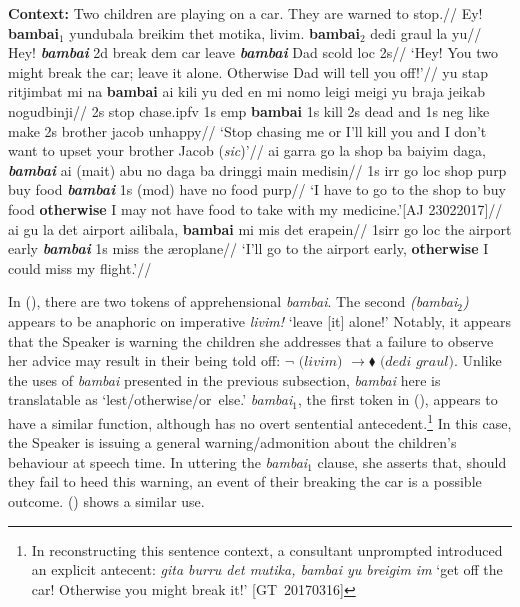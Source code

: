 \pex[interpartskip=1ex]
\a{}\begingl
\glpreamble \textbf{Context:} Two children are playing on a car. They are warned to stop.//
\gla Ey! \textbf{bambai$_1$} yundubala breikim thet motika, livim. \textbf{bambai$_2$} dedi graul la yu//
\glb Hey! \textbf{\textit{bambai}} 2d break {\sc dem} car leave \textbf{\textit{bambai}} Dad scold {\sc loc} 2s//
\glft `Hey! You two might break the car; leave it alone. Otherwise Dad will tell you off!'\trailingcitation[A\&SB: 273]//
\endgl
\a
\begingl{}
\gla yu stap ritjimbat mi na \textbf{bambai} ai kili yu ded en mi nomo leigi meigi yu braja jeikab nogudbinji//
\glb 2s stop chase.\gls{ipfv} 1s {\sc emp} {\bf bambai} 1s kill 2s dead and 1s \gls{neg} like make 2s brother jacob unhappy//
\glft`Stop chasing me or I'll kill you and I don't want to upset your brother Jacob (\textit{sic})'//
\endgl
\a{}\begingl\gla ai garra go la shop ba baiyim daga, \textbf{\textit{bambai}} ai (mait) abu no daga ba dringgi main medisin//
\glb 1s {\sc irr} go {\sc loc} shop {\sc purp} buy food \textit{\textbf{bambai}} 1s (\gls{mod}) have no food \gls{purp}//
\glft `I have to go to the shop to buy food \textbf{otherwise} I may not have food to take with my medicine.'\hspace*{\fill}[AJ 23022017]//
\endgl
\a\begingl\gla ai gu la det \textup{airport} ailibala, \textbf{bambai} mi mis det erapein//
\glb 1s\textdblhyphen\gls{irr} go \gls{loc} the airport early \textit{\textbf{bambai}} 1s miss the æroplane//
\glft`I'll go to the airport early, \textbf{otherwise} I could miss my flight.'\trailingcitation{[GT~16032017-21']}//\endgl
\xe

In (), there are two tokens of apprehensional \textit{bambai}. The second \textit{(bambai$_2$)} appears to be anaphoric on imperative \textit{livim!} `leave [it] alone!' Notably, it appears that the Speaker is warning the children she addresses that a failure to observe her advice may result in their being told off: $\neg \textit{ (livim) }\to\blacklozenge \textit{ (dedi graul)}$. Unlike the uses of \textit{bambai} presented in the previous subsection, \textit{bambai} here is translatable as `lest/otherwise/or~else.' \textit{bambai$_1$}, the first token in (), appears to have a similar function, although has no overt sentential antecedent.\footnote{In reconstructing this sentence context, a consultant unprompted introduced an explicit antecent: \textit{gita burru det mutika, bambai yu breigim im} `get off the car! Otherwise you might break it!' [GT~20170316]} In this case, the Speaker is issuing a general warning/admonition about the children's behaviour at speech time. In uttering the \textit{bambai$_1$} clause, she asserts that, should they fail to heed this warning, an event of their breaking the car is a possible outcome. () shows a similar use.

